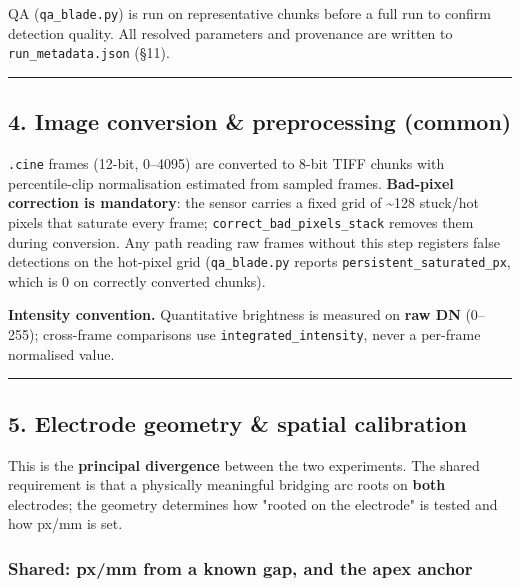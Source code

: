 \documentclass[
  11pt,
]{article}
\begin{document}
QA (\texttt{qa\_blade.py}) is run on representative chunks before a full
run to confirm detection quality. All resolved parameters and provenance
are written to \texttt{run\_metadata.json} (§11).

\begin{center}\rule{0.5\linewidth}{0.5pt}\end{center}

\hypertarget{4-image-conversion--preprocessing-common}{%
\subsection{4. Image conversion \& preprocessing
(common)}\label{4-image-conversion--preprocessing-common}}

\texttt{.cine} frames (12-bit, 0--4095) are converted to 8-bit TIFF
chunks with percentile-clip normalisation estimated from sampled frames.
\textbf{Bad-pixel correction is mandatory}: the sensor carries a fixed
grid of \textasciitilde128 stuck/hot pixels that saturate every frame;
\texttt{correct\_bad\_pixels\_stack} removes them during conversion. Any
path reading raw frames without this step registers false detections on
the hot-pixel grid (\texttt{qa\_blade.py} reports
\texttt{persistent\_saturated\_px}, which is 0 on correctly converted
chunks).

\textbf{Intensity convention.} Quantitative brightness is measured on
\textbf{raw DN} (0--255); cross-frame comparisons use
\texttt{integrated\_intensity}, never a per-frame normalised value.

\begin{center}\rule{0.5\linewidth}{0.5pt}\end{center}

\hypertarget{5-electrode-geometry--spatial-calibration}{%
\subsection{5. Electrode geometry \& spatial
calibration}\label{5-electrode-geometry--spatial-calibration}}

This is the \textbf{principal divergence} between the two experiments.
The shared requirement is that a physically meaningful bridging arc
roots on \textbf{both} electrodes; the geometry determines how "rooted
on the electrode" is tested and how px/mm is set.

\hypertarget{shared-pxmm-from-a-known-gap-and-the-apex-anchor}{%
\subsubsection{Shared: px/mm from a known gap, and the apex
anchor}\label{shared-pxmm-from-a-known-gap-and-the-apex-anchor}}
\end{document}

